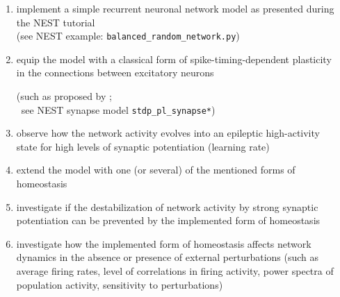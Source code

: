 \documentclass[8pt,t,usepdftitle=false]{beamer}
\begin{document}
\begin{frame}[t,plain]
  \frametitle{\ttl}
  \begin{columns}
    \begin{column}{0.6\linewidth}
      \begin{enumerate}\itemsep1ex
      \item<1-> implement a simple recurrent neuronal network model as presented during the NEST tutorial\\
        {\tiny (see NEST example: \texttt{balanced\_random\_network.py})}
      \item<2-> equip the model with a classical form of spike-timing-dependent plasticity in the connections between excitatory neurons\\[1ex]
        \parbox{\linewidth}{\tiny{}
          (such as proposed by \textcite{Morrison07_1437};\\
          ~see NEST synapse model \texttt{stdp\_pl\_synapse*})
        }
      \item<3-> observe how the network activity evolves into an epileptic high-activity state for high levels of synaptic potentiation (learning rate)
      \item<4-> extend the model with one (or several) of the mentioned forms of homeostasis
      \item<5-> investigate if the destabilization of network activity by strong synaptic potentiation can be prevented by the implemented form of homeostasis
      \item<6-> investigate how the implemented form of homeostasis affects network dynamics in the absence or presence of external perturbations (such as average firing rates, level of correlations in firing activity, power spectra of population activity, sensitivity to perturbations)\\
      \end{enumerate}      
    \end{column}
    \begin{column}{0.4\linewidth}
      \vspace*{-7ex}
      \begin{center}
\end{center}
\end{column}
\end{columns}
\end{frame}
\end{document}
